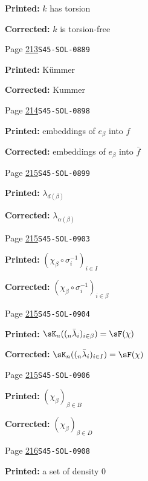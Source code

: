 \documentclass[oneside]{book}
\theoremstyle{sga-source}
\theoremstyle{sga-source-dash}
\theoremstyle{sga-source-dotdash}
\theoremstyle{sga-source-number-note-dash}
\theoremstyle{sga-source-note-number-dotdash}
\theoremstyle{sga-source-example-dotdash}
\theoremstyle{sga-source-inline-number}
\theoremstyle{sga-source-bare-number}
\theoremstyle{sga-source}
\begin{document}
\begin{description}
\par\noindent\textbf{Printed:} $k$ has torsion
\par\noindent\textbf{Corrected:} $k$ is torsion-free
\smallskip
\item[\hypertarget{apparatus:EN-0154}{154}] Page \hyperlink{printpage:en:213}{213}\quad\texttt{S45-SOL-0889}
\par\noindent\textbf{Printed:} K\"ummer
\par\noindent\textbf{Corrected:} Kummer
\smallskip
\item[\hypertarget{apparatus:EN-0155}{155}] Page \hyperlink{printpage:en:214}{214}\quad\texttt{S45-SOL-0898}
\par\noindent\textbf{Printed:} embeddings of $e_\beta$ into $f$
\par\noindent\textbf{Corrected:} embeddings of $e_\beta$ into $\bar f$
\smallskip
\item[\hypertarget{apparatus:EN-0156}{156}] Page \hyperlink{printpage:en:215}{215}\quad\texttt{S45-SOL-0899}
\par\noindent\textbf{Printed:} \(\lambda_{d(\beta)}\)
\par\noindent\textbf{Corrected:} \(\lambda_{\alpha(\beta)}\)
\smallskip
\item[\hypertarget{apparatus:EN-0157}{157}] Page \hyperlink{printpage:en:215}{215}\quad\texttt{S45-SOL-0903}
\par\noindent\textbf{Printed:} \((\chi_\beta\circ \sigma_i^{-1})_{i\in I}\)
\par\noindent\textbf{Corrected:} \((\chi_\beta\circ \sigma_i^{-1})_{i\in\beta}\)
\smallskip
\item[\hypertarget{apparatus:EN-0158}{158}] Page \hyperlink{printpage:en:215}{215}\quad\texttt{S45-SOL-0904}
\par\noindent\textbf{Printed:} \(\sK_n((_n\bar\lambda_i)_{i\in \beta}) = \sF(\chi)\)
\par\noindent\textbf{Corrected:} \(\sK_n((_n\bar\lambda_i)_{i\in I}) = \sF(\chi)\)
\smallskip
\item[\hypertarget{apparatus:EN-0159}{159}] Page \hyperlink{printpage:en:215}{215}\quad\texttt{S45-SOL-0906}
\par\noindent\textbf{Printed:} \((\chi_\beta)_{\beta\in B}\)
\par\noindent\textbf{Corrected:} \((\chi_\beta)_{\beta\in D}\)
\smallskip
\item[\hypertarget{apparatus:EN-0160}{160}] Page \hyperlink{printpage:en:216}{216}\quad\texttt{S45-SOL-0908}
\par\noindent\textbf{Printed:} a set of density $0$

\end{description}
\end{document}
